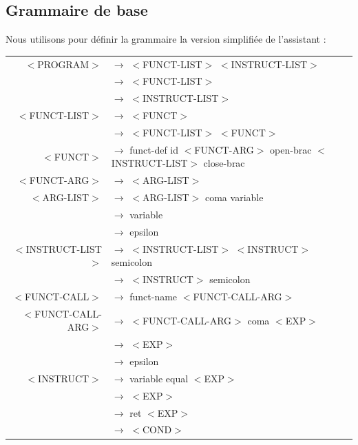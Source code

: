 \documentclass[a4paper,10pt]{article}
\begin{document}
	\subsection{Grammaire de base}
	
	Nous utilisons pour définir la grammaire la version simplifiée de l'assistant : \\
	
	
\hspace{-3.0cm}\begin{tabular}{rl}
$<$PROGRAM$>$		& $\rightarrow$ $<$FUNCT-LIST$>$ $<$INSTRUCT-LIST$>$\\
					& $\rightarrow$ $<$FUNCT-LIST$>$\\
					& $\rightarrow$ $<$INSTRUCT-LIST$>$\\
					
					
$<$FUNCT-LIST$>$	& $\rightarrow$ $<$FUNCT$>$ \\
					& $\rightarrow$ $<$FUNCT-LIST$>$ $<$FUNCT$>$\\
					
$<$FUNCT$>$			& $\rightarrow$ funct-def id $<$FUNCT-ARG$>$ open-brac $<$INSTRUCT-LIST$>$ close-brac \\


					
$<$FUNCT-ARG$>$		& $\rightarrow$ $<$ARG-LIST$>$ \\

$<$ARG-LIST$>$		& $\rightarrow$ $<$ARG-LIST$>$ coma variable \\ 
					& $\rightarrow$ variable\\ 
					& $\rightarrow$ epsilon \\

$<$INSTRUCT-LIST$>$	& $\rightarrow$ $<$INSTRUCT-LIST$>$ $<$INSTRUCT$>$ semicolon\\
					& $\rightarrow$ $<$INSTRUCT$>$ semicolon\\
					
$<$FUNCT-CALL$>$	& $\rightarrow$ funct-name $<$FUNCT-CALL-ARG$>$\\

$<$FUNCT-CALL-ARG$>$& $\rightarrow$ $<$FUNCT-CALL-ARG$>$ coma $<$EXP$>$\\
					& $\rightarrow$ $<$EXP$>$\\
					& $\rightarrow$ epsilon\\

$<$INSTRUCT$>$		& $\rightarrow$ variable equal $<$EXP$>$\\
					& $\rightarrow$ $<$EXP$>$\\
					& $\rightarrow$ ret $<$EXP$>$\\
					& $\rightarrow$ $<$COND$>$\\
					

\end{tabular}
\end{document}
